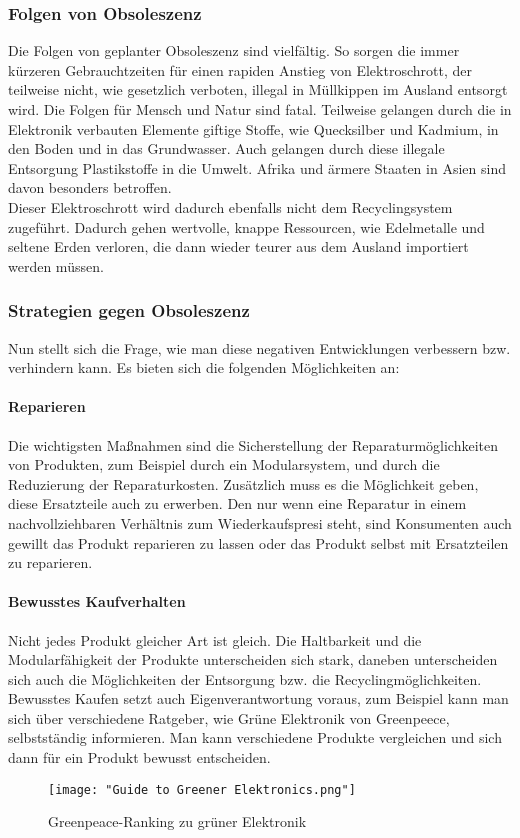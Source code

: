 \documentclass[13pt,titlepage]{article}
\begin{document}
	\subsubsection {Folgen von Obsoleszenz}
	Die Folgen von geplanter Obsoleszenz sind vielfältig. So sorgen die immer kürzeren Gebrauchtzeiten für einen rapiden Anstieg von Elektroschrott, der teilweise nicht, wie gesetzlich verboten, illegal in Müllkippen im Ausland entsorgt wird. 
Die Folgen für Mensch und Natur sind fatal. Teilweise gelangen durch die in Elektronik verbauten Elemente giftige Stoffe, wie Quecksilber und Kadmium, in den Boden und in das Grundwasser. 
Auch gelangen durch diese illegale Entsorgung Plastikstoffe in die Umwelt.
Afrika und \"armere Staaten in Asien sind davon besonders betroffen.\protect\footnotemark{} \\
	Dieser Elektroschrott wird dadurch ebenfalls nicht dem Recyclingsystem zugeführt. 
Dadurch gehen wertvolle, knappe Ressourcen, wie Edelmetalle und seltene Erden verloren, die dann wieder teurer aus dem Ausland importiert werden müssen. 

	\subsubsection {Strategien gegen Obsoleszenz}
	Nun stellt sich die Frage, wie man diese negativen Entwicklungen verbessern bzw. verhindern kann. 
Es bieten sich die folgenden M\"oglichkeiten an:
	\paragraph {Reparieren}
	Die wichtigsten Maßnahmen sind die Sicherstellung der Reparaturm\"oglichkeiten von Produkten, zum Beispiel durch ein Modularsystem,  und durch die Reduzierung der Reparaturkosten. 
Zus\"atzlich muss es die M\"oglichkeit geben, diese Ersatzteile auch zu erwerben. 
Den nur wenn eine Reparatur in einem nachvollziehbaren Verh\"altnis zum Wiederkaufspresi steht, sind Konsumenten auch gewillt das Produkt reparieren zu lassen oder das Produkt selbst mit Ersatzteilen zu reparieren. 
	\paragraph {Bewusstes Kaufverhalten}
	Nicht jedes Produkt gleicher Art ist gleich. Die Haltbarkeit und die Modularf\"ahigkeit der Produkte unterscheiden sich stark, daneben unterscheiden sich auch die M\"oglichkeiten der Entsorgung bzw. die Recyclingm\"oglichkeiten. 
Bewusstes Kaufen setzt auch Eigenverantwortung voraus, zum Beispiel kann man sich \"uber verschiedene Ratgeber, wie Gr\"une Elektronik von Greenpeece\protect\footnotemark{}, selbstst\"andig informieren.
Man kann verschiedene Produkte vergleichen und sich dann f\"ur ein Produkt bewusst entscheiden.
	\begin{figure}[h]
	 \centering
	 \texttt{[image: "Guide to Greener Elektronics.png"]}
	 \caption{Greenpeace-Ranking zu grüner Elektronik\protect\footnotemark}
	 \label{fig:GreenerElektronics}
	\end{figure}
\end{document}
